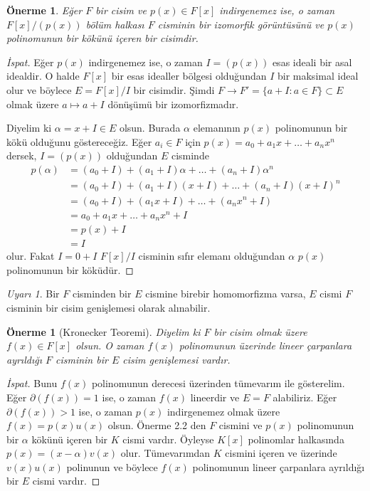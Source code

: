\documentclass[draft]{article}
\newtheorem{prop}[thm]{Önerme}
\theoremstyle{definition}
\theoremstyle{remark}
\newtheorem{rem}{Uyarı}[section]
\begin{document}
			\begin{prop}
			    Eğer $F$ bir cisim ve $p(x) \in F[x]$ indirgenemez ise, o zaman $F[x]/(p(x))$ bölüm halkası $F$ cisminin bir izomorfik görüntüsünü ve $p(x)$ polinomunun bir kökünü içeren bir cisimdir.
			\end{prop}
			
			\begin{proof}[İspat]
			    Eğer $p(x)$ indirgenemez ise, o zaman $I = (p(x))$ esas ideali bir asal idealdir. O halde $F[x]$ bir esas idealler bölgesi olduğundan $I$ bir maksimal ideal olur ve böylece $E = F[x]/I$ bir cisimdir. Şimdi $F \to F' = \{a + I : a \in F\} \subset E$ olmak üzere $a \mapsto a + I$ dönüşümü bir izomorfizmadır.\par
			    Diyelim ki $\alpha = x + I \in E$ olsun. Burada $\alpha$ elemanının $p(x)$ polinomunun bir kökü olduğunu göstereceğiz. Eğer $a_i \in F$ için $p(x) = a_0 + a_1x + \dots + a_nx^n$ dersek, $I = (p(x))$ olduğundan $E$ cisminde
				\begin{align*}
					p(\alpha) &= (a_0 + I) + (a_1 + I)\alpha + \dots + (a_n + I)\alpha^n\\
					&= (a_0 + I) + (a_1 + I)(x + I) + \dots + (a_n + I)(x + I)^n\\
					&= (a_0 + I) + (a_1x + I) + \dots + (a_nx^n + I)\\
					&= a_0 + a_1x + \dots + a_nx^n + I\\
					&= p(x) + I\\
					&= I
				\end{align*}
				olur. Fakat $I = 0 + I$ $F[x]/I$ cisminin sıfır elemanı olduğundan $\alpha$ $p(x)$ polinomunun bir köküdür.
			\end{proof}
			
			\begin{rem}
			    Bir $F$ cisminden bir $E$ cismine birebir homomorfizma varsa, $E$ cismi $F$ cisminin bir cisim genişlemesi olarak alınabilir.
			\end{rem}
			
			\begin{prop}[Kronecker Teoremi]
			    Diyelim ki $F$ bir cisim olmak üzere $f(x) \in F[x]$ olsun. O zaman $f(x)$ polinomunun üzerinde lineer çarpanlara ayrıldığı $F$ cisminin bir $E$ cisim genişlemesi vardır.
			\end{prop}
			
			\begin{proof}[İspat]
			    Bunu $f(x)$ polinomunun derecesi üzerinden tümevarım ile gösterelim. Eğer $\partial(f(x)) = 1$ ise, o zaman $f(x)$ lineerdir ve $E = F$ alabiliriz. Eğer $\partial(f(x)) > 1$ ise, o zaman $p(x)$ indirgenemez olmak üzere $f(x) = p(x)u(x)$ olsun. Önerme 2.2 den $F$ cismini ve $p(x)$ polinomunun bir $\alpha$ kökünü içeren bir $K$ cismi vardır. Öyleyse $K[x]$ polinomlar halkasında $p(x) = (x - \alpha)v(x)$ olur. Tümevarımdan $K$ cismini içeren ve üzerinde $v(x)u(x)$ polinunun ve böylece $f(x)$ polinomunun lineer çarpanlara ayrıldığı bir $E$ cismi vardır.
			\end{proof}
			
\end{document}
